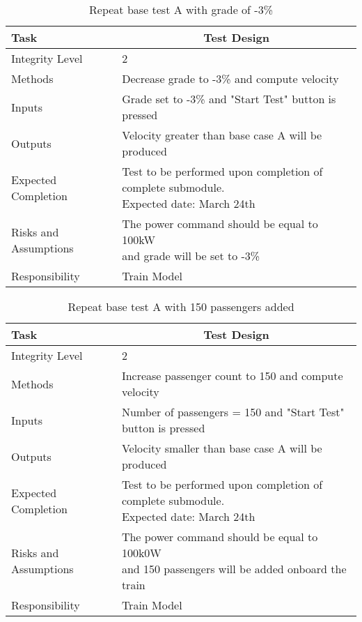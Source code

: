 \documentclass[]{article}
\begin{document}
	\begin{table}[H]
		\centering
		\caption{Repeat base test A with grade of -3\%}
		\begin{tabular}{|l|l|}
			\hline
			Task & \multicolumn{1}{c|}{Test Design} \\ \hline
			Integrity Level & 2 \\ \hline
			Methods & Decrease grade to -3\% and compute velocity  \\ \hline
			Inputs &  Grade set to -3\% and "Start Test" button is pressed \\ \hline
			Outputs &  Velocity greater than base case A will be produced  \\ \hline
			Expected Completion & \parbox[t]{10cm}{Test to be performed upon completion of complete submodule.\\ Expected date: March 24th}\\ \hline
			Risks and Assumptions &\parbox[t]{10cm}{ The power command should be equal to 100kW \\and grade will be set to -3\%} \\ \hline
			Responsibility & Train Model\\ \hline
		\end{tabular}
	\end{table}
   
   	\begin{table}[H]
	   	\centering
	   	\caption{Repeat base test A with 150 passengers added}
	   	\begin{tabular}{|l|l|}
	   		\hline
	   		Task & \multicolumn{1}{c|}{Test Design} \\ \hline
	   		Integrity Level & 2 \\ \hline
	   		Methods & Increase passenger count to 150 and compute velocity  \\ \hline
	   		Inputs &  Number of passengers = 150 and "Start Test" button is pressed \\ \hline
	   		Outputs &  Velocity smaller than base case A will be produced  \\ \hline
	   		Expected Completion & \parbox[t]{10cm}{Test to be performed upon completion of complete submodule.\\ Expected date: March 24th}\\ \hline
	   		Risks and Assumptions & \parbox[t]{10cm}{The power command should be equal to 100k0W \\and 150 passengers will be added onboard the train} \\ \hline
	   		Responsibility & Train Model\\ \hline
	   	\end{tabular}
   \end{table}
\end{document}
